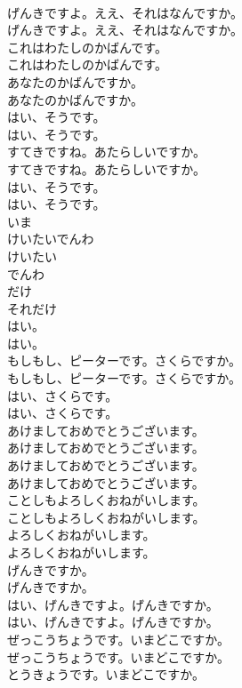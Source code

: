 \documentclass[8pt]{extreport}
\begin{document}
\begin{CJK}{UTF8}{min}
\\	げんきですよ。ええ、それはなんですか。	
\\	げんきですよ。ええ、それはなんですか。 
\\	これはわたしのかばんです。	
\\	これはわたしのかばんです。 
\\	あなたのかばんですか。	
\\	あなたのかばんですか。 
\\	はい、そうです。	
\\	はい、そうです。 
\\	すてきですね。あたらしいですか。	
\\	すてきですね。あたらしいですか。 
\\	はい、そうです。	
\\	はい、そうです。 
\\	いま
\\	けいたいでんわ
\\	けいたい
\\	でんわ
\\	だけ
\\	それだけ
\\	はい。	
\\	はい。 
\\	もしもし、ピーターです。さくらですか。	
\\	もしもし、ピーターです。さくらですか。 
\\	はい、さくらです。	
\\	はい、さくらです。 
\\	あけましておめでとうございます。	
\\	あけましておめでとうございます。 
\\	あけましておめでとうございます。	
\\	あけましておめでとうございます。 
\\	ことしもよろしくおねがいします。	
\\	ことしもよろしくおねがいします。 
\\	よろしくおねがいします。	
\\	よろしくおねがいします。 
\\	げんきですか。	
\\	げんきですか。 
\\	はい、げんきですよ。げんきですか。	
\\	はい、げんきですよ。げんきですか。 
\\	ぜっこうちょうです。いまどこですか。	
\\	ぜっこうちょうです。いまどこですか。 
\\	とうきょうです。いまどこですか。	

\end{CJK}
\end{document}
